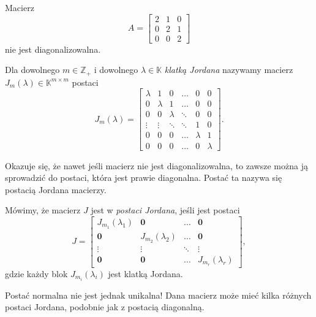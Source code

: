 \begin{example}
	Macierz
	\begin{equation}
		A = \left[\begin{matrix}
			2 & 1 & 0 \\
			0 & 2 & 1 \\
			0 & 0 & 2
		\end{matrix}\right]
	\end{equation}
	nie jest diagonalizowalna.
	
\end{example}

\begin{definition}
	Dla dowolnego $m \in \mathbb{Z}_+$ i dowolnego $\lambda \in \mathbb{K}$
		\textit{klatką Jordana} nazywamy macierz $J_m(\lambda) \in \mathbb{K}^{m \times m}$
	postaci
	\begin{equation}
		J_m(\lambda) = \left[\begin{matrix}
			\lambda & 1 & 0 & \dots & 0 & 0 \\
			0 & \lambda & 1 & \dots & 0 & 0 \\
			0 & 0 & \lambda & \ddots & 0 & 0 \\
			\vdots & \vdots & \ddots & \ddots & 1 & 0 \\
			0 & 0 & 0 & \dots & \lambda & 1 \\
			0 & 0 & 0 & \dots & 0 & \lambda
		\end{matrix}\right].
	\end{equation}
\end{definition}

Okazuje się,
	że nawet jeśli macierz nie jest diagonalizowalna,
	to zawsze można ją sprowadzić do postaci,
	która jest prawie diagonalna.
Postać ta nazywa się postacią Jordana macierzy.
\begin{definition}
	Mówimy, że macierz $J$ jest w \textit{postaci Jordana},
		jeśli jest postaci
	\begin{equation}
		J =  \left[\begin{matrix}
			J_{m_1}(\lambda_1) & \textbf{0} & \dots & \textbf{0} \\
			\textbf{0} & J_{m_2}(\lambda_2) & \dots & \textbf{0} \\
			\vdots & \vdots & \ddots & \vdots \\
			\textbf{0} & \textbf{0} & \dots & J_{m_r}(\lambda_r)
		\end{matrix}\right],
	\end{equation}
	gdzie każdy blok $J_{m_i}(\lambda_i)$ jest klatką Jordana.
\end{definition}
Postać normalna nie jest jednak unikalna!
Dana macierz może mieć kilka różnych postaci Jordana,
	podobnie jak z postacią diagonalną.

